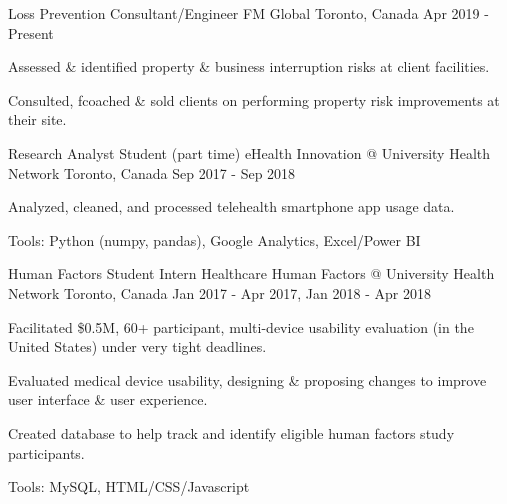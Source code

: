 
\newcommand{\toronto}{Toronto, Canada}
\newcommand{\winnipeg}{Winnipeg, Canada}
\newcommand{\weingarten}{Weingarten, Germany}

\begin{cventries}

  \cventry
    {Loss Prevention Consultant/Engineer} %
    {FM Global} %
    {\toronto} %
    {Apr 2019 - Present} %
    {
      \begin{cvitems} %
        \item {Assessed \& identified property \& business interruption risks at client facilities.}
        \item {Consulted, fcoached \& sold clients on performing property risk improvements at their site.}
      \end{cvitems}
    }

  \cventry
    {Research Analyst Student (part time)} %
    {eHealth Innovation @ University Health Network} %
    {\toronto} %
    {Sep 2017 - Sep 2018} %
    {
      \begin{cvitems} %
        \item {Analyzed, cleaned, and processed telehealth smartphone app usage data.}
        \item {Tools: Python (numpy, pandas), Google Analytics, Excel/Power BI}
      \end{cvitems}
    }

  \cventry
    {Human Factors Student Intern} %
    {Healthcare Human Factors @ University Health Network} %
    {\toronto} %
    {Jan 2017 - Apr 2017, Jan 2018 - Apr 2018} %
    {
      \begin{cvitems} %
        \item {Facilitated \$0.5M, 60+ participant, multi-device usability evaluation (in the United States) under very tight deadlines.}
        \item {Evaluated medical device usability, designing \& proposing changes to improve user interface \& user experience.}
        \item {Created database to help track and identify eligible human factors study participants.}
        \item {Tools: MySQL, HTML/CSS/Javascript}
      \end{cvitems}
    }


\end{cventries}
